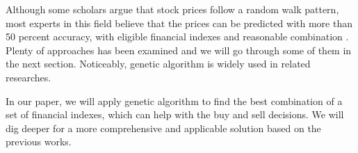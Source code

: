 \documentclass{article}
\begin{document}
Although some scholars argue that stock prices follow a random walk pattern,
most experts in this field believe that the prices can be predicted with more than 50 percent accuracy,
with eligible financial indexes and reasonable combination \cite{stock-market-prediction-with-multiple-classifiers}.
Plenty of approaches has been examined and we will go through some of them in the next section.
Noticeably, genetic algorithm is widely used in related researches.


In our paper, we will apply genetic algorithm to
find the best combination of a set of financial indexes, which can help with the buy and sell decisions.
We will dig deeper for a more comprehensive and applicable solution based on the previous works.





\end{document}
